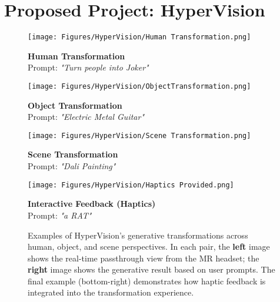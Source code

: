 \chapter{Proposed Project: HyperVision}

\begin{figure}[ht!]
    \centering

    \begin{minipage}[b]{0.48\textwidth}
        \centering
        \texttt{[image: Figures/HyperVision/Human Transformation.png]}
        
        \textbf{Human Transformation} \\
        Prompt: \textit{"Turn people into Joker"}
    \end{minipage}
    \hfill
    \begin{minipage}[b]{0.48\textwidth}
        \centering
        \texttt{[image: Figures/HyperVision/ObjectTransformation.png]}
        
        \textbf{Object Transformation} \\
        Prompt: \textit{"Electric Metal Guitar"}
    \end{minipage}

    \vspace{0.5em}

    \begin{minipage}[b]{0.48\textwidth}
        \centering
        \texttt{[image: Figures/HyperVision/Scene Transformation.png]}
        
        \textbf{Scene Transformation} \\
        Prompt: \textit{"Dali Painting"}
    \end{minipage}
    \hfill
    \begin{minipage}[b]{0.48\textwidth}
        \centering
        \texttt{[image: Figures/HyperVision/Haptics Provided.png]}
        
        \textbf{Interactive Feedback (Haptics)} \\
        Prompt: \textit{"a RAT"}
    \end{minipage}

    \caption{
        Examples of HyperVision’s generative transformations across human, object, and scene perspectives. In each pair, the \textbf{left} image shows the real-time passthrough view from the MR headset; the \textbf{right} image shows the generative result based on user prompts. The final example (bottom-right) demonstrates how haptic feedback is integrated into the transformation experience.
    }
    \label{fig:hypervision-modes}
\end{figure}


